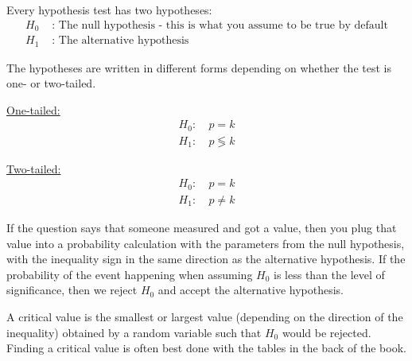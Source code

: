 \documentclass[../main.tex]{subfile}
\begin{document}

Every hypothesis test has two hypotheses:
\begin{align*}
	H_0 & \text{ : The null hypothesis - this is what you assume to be true by default}\\
	H_1 & \text{ : The alternative hypothesis}
\end{align*}

The hypotheses are written in different forms depending on whether the test is one- or two-tailed.

\begin{minipage}{0.49\linewidth}
	\begin{center}
		\underline{One-tailed:}
		\begin{align*}
			H_0:&\ p = k\\
			H_1:&\ p \lessgtr k
		\end{align*}
	\end{center}
\end{minipage}\hfill
\begin{minipage}{0.49\linewidth}
	\begin{center}
		\underline{Two-tailed:}
		\begin{align*}
			H_0:&\ p = k\\
			H_1:&\ p \ne k
		\end{align*}
	\end{center}
\end{minipage}

If the question says that someone measured and got a value, then you plug that value into a probability calculation with the parameters from the null hypothesis, with the inequality sign in the same direction as the alternative hypothesis. If the probability of the event happening when assuming $H_0$ is less than the level of significance, then we reject $H_0$ and accept the alternative hypothesis.

A critical value is the smallest or largest value (depending on the direction of the inequality) obtained by a random variable such that $H_0$ would be rejected. Finding a critical value is often best done with the tables in the back of the book.
\end{document}

